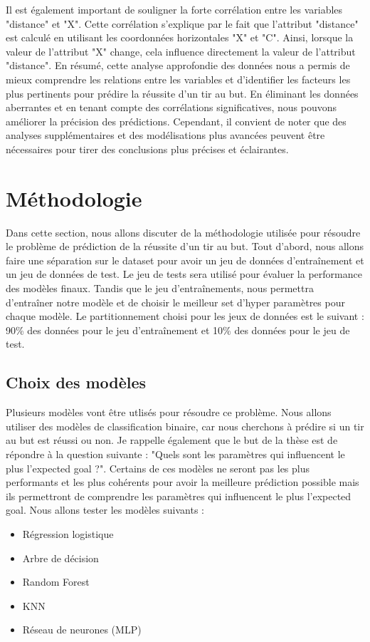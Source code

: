 \documentclass[12pt]{article}
\begin{document}
Il est également important de souligner la forte corrélation entre les variables "distance" et "X". 
Cette corrélation s'explique par le fait que l'attribut "distance" est calculé en utilisant les coordonnées horizontales "X" et "C". 
Ainsi, lorsque la valeur de l'attribut "X" change, cela influence directement la valeur de l'attribut "distance". 
\newline\newline
En résumé, cette analyse approfondie des données nous a permis de mieux comprendre les relations entre les variables et d'identifier les facteurs les plus pertinents pour prédire la réussite d'un tir au but. 
En éliminant les données aberrantes et en tenant compte des corrélations significatives, nous pouvons améliorer la précision des prédictions.
Cependant, il convient de noter que des analyses supplémentaires et des modélisations plus avancées peuvent être nécessaires pour tirer des conclusions plus précises et éclairantes.

\newpage

\section{Méthodologie}
\label{sec:methodologie}
Dans cette section, nous allons discuter de la méthodologie utilisée pour résoudre le problème de prédiction de la réussite d'un tir au but.
Tout d'abord, nous allons faire une séparation sur le dataset pour avoir un jeu de données d'entraînement et un jeu de données de test.
Le jeu de tests sera utilisé pour évaluer la performance des modèles finaux. 
Tandis que le jeu d'entraînements, nous permettra d'entraîner notre modèle et de choisir le meilleur set d'hyper paramètres pour chaque modèle.
Le partitionnement choisi pour les jeux de données est le suivant : 90\% des données pour le jeu d'entraînement et 10\% des données pour le jeu de test.

\subsection{Choix des modèles}
Plusieurs modèles vont être utlisés pour résoudre ce problème.
Nous allons utiliser des modèles de classification binaire, car nous cherchons à prédire si un tir au but est réussi ou non.
Je rappelle également que le but de la thèse est de répondre à la question suivante : "Quels sont les paramètres qui influencent le plus l'expected goal ?".
Certains de ces modèles ne seront pas les plus performants et les plus cohérents pour avoir la meilleure prédiction possible mais ils permettront de comprendre les paramètres qui influencent le plus l'expected goal.
Nous allons tester les modèles suivants :
\begin{itemize}
    \item Régression logistique
    \item Arbre de décision
    \item Random Forest
    \item KNN
    \item Réseau de neurones (MLP)
\end{itemize}
\end{document}
